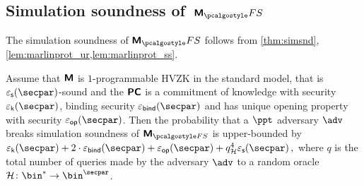 \subsection{Simulation soundness of~$\marlinprotfs$}
	The simulation soundness of $\marlinprot_\fs$ follows from \cref{thm:simsnd}, \cref{lem:marlinprot_ur,lem:marlinprot_ss}.
\begin{corollary}
	\label{cor:simsnd-M}
	Assume that $\bm{\mathsf{M}}$ is $1$-programmable HVZK in the standard model, that
	is $\epss(\secpar)$-sound and the $\bm{\mathsf{PC}}$ is a commitment of knowledge with
	security $\epsk(\secpar)$, binding security $\epsbind(\secpar)$ and has unique
	opening property with security $\epsop(\secpar)$. Then the probability that a
	$\ppt$ adversary $\adv$ breaks simulation soundness of $\marlinprot_{\fs}$ is
	upper-bounded by
	\( \epsk(\secpar) + 2\cdot\epsbind(\secpar) + \epsop(\secpar) + q_\ro^4
	\epss(\secpar)\,, \) where $q$ is the total number of queries made by the
	adversary $\adv$ to a random oracle $\ro\colon \bin^{*} \to \bin^{\secpar}$.
\end{corollary}


